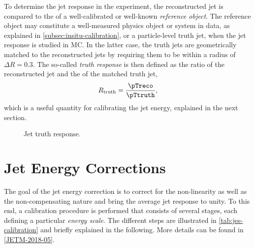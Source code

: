To determine the jet response in the experiment, the reconstructed jet \pT is compared to the \pT of a well-calibrated or well-known \emph{reference object}. The reference object may constitute a well-measured physics object or system in data, as explained in \cref{subsec:insitu-calibration}, or a particle-level truth jet, when the jet response is studied in MC.
In the latter case, the truth jets are geometrically matched to the reconstructed jets by requiring them to be within a radius of $\Delta R = 0.3$.
The so-called \emph{truth response} is then defined as the ratio of the reconstructed jet \pT and the \pT of the matched truth jet,
\begin{equation}
    R_{\text{truth}} =  \frac{\pTreco}{\pTtruth},
\end{equation}
which is a useful quantity for calibrating the jet energy, explained in the next section.

\FloatBarrier
\begin{figure}[t]
    \caption{Jet truth response.}
    \label{fig:truth-response}
\end{figure}


\section{Jet Energy Corrections}
\label{sec:jes-calibration}
The goal of the jet energy correction is to correct for the non-linearity as well as the non-compensating nature and bring the average jet response to unity.
To this end, a calibration procedure is performed that consists of several stages, each defining a particular \emph{energy scale}. The different steps are illustrated in \cref{tab:jes-calibration} and briefly explained in the following. More details can be found in \cref{JETM-2018-05}.

